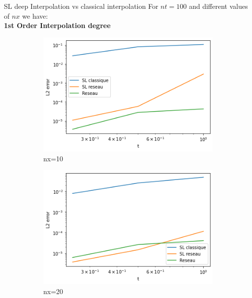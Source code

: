 \begin{frame}{SL deep Interpolation vs classical interpolation}
    For $nt=100$ and different values of $nx$ we have:\\
    \textbf{1st Order Interpolation degree}
    \begin{figure}
        \centering
        
        \begin{subfigure}{0.2\textwidth}
            \centering
            \includegraphics[width=\textwidth]{images/i110.png}
            \caption{nx=10}
        \end{subfigure}
        \begin{subfigure}{0.2\textwidth}
            \centering
            \includegraphics[width=\textwidth]{images/i120.png}
            \caption{nx=20}
        \end{subfigure}
        \begin{subfigure}{0.2\textwidth}

\end{subfigure}
\end{figure}
\end{frame}
